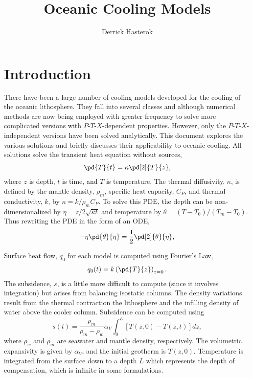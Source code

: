 \documentclass[final,12pt,a4paper]{article}
\title{Oceanic Cooling Models}
\author{Derrick Hasterok}
\begin{document}
\maketitle

\section{Introduction}
There have been a large number of cooling models developed for the
cooling of the oceanic lithosphere.  They fall into several classes and
although numerical methods are now being employed with greater frequency
to solve more complicated versions with $P$-$T$-$X$-dependent
properties.  However, only the $P$-$T$-$X$-independent versions have
been solved analytically.  This document explores the various solutions
and briefly discusses their applicability to oceanic cooling.  All
solutions solve the transient heat equation without sources,
\begin{equation}
    \pd{T}{t} = \kappa \pd[2]{T}{z},
\end{equation}
where $z$ is depth, $t$ is time, and $T$ is temperature.  The thermal
diffusivity, $\kappa$, is defined by the mantle density, $\rho_{m}$,
specific heat capacity, $C_{P}$, and thermal conductivity, $k$, by
$\kappa = k / \rho_{m} C_{P}$.  To solve this PDE, the depth can be
non-dimensionalized by $\eta = z / 2 \sqrt{\kappa t}$ and temperature by
$\theta = (T - T_{0}) / (T_{m} - T_{0})$.  Thus rewriting the PDE in the
form of an ODE,
\begin{equation}
    -\eta \pd{\theta}{\eta} = \frac{1}{2} \pd[2]{\theta}{\eta},
\end{equation}

Surface heat flow, $q_{0}$ for each model is computed using Fourier's Law,
\begin{equation}
    q_{0}(t) = k\left( \pd{T}{z} \right)_{z = 0}.
    \label{eq-heatflow}
\end{equation}
The subsidence, $s$, is a little more difficult to compute (since it
involves integration) but arises from balancing isostatic columns.  The
density variations result from the thermal contraction the lithosphere
and the infilling density of water above the cooler column.  Subsidence
can be computed using
\begin{equation}
    s(t) = \frac{\rho_{m}}{\rho_{m} - \rho_{w}} \alpha_{V}
        \int_{0}^{L} [ T(z,0) - T(z,t) ] dz,
    \label{eq-subsidence}
\end{equation}
where $\rho_{w}$ and $\rho_{m}$ are seawater and mantle density,
respectively.  The volumetric expansivity is given by $\alpha_{V}$, and
the initial geotherm is $T(z,0)$.  Temperature is integrated from the
surface down to a depth $L$ which represents the depth of compensation,
which is infinite in some formulations.
\end{document}
